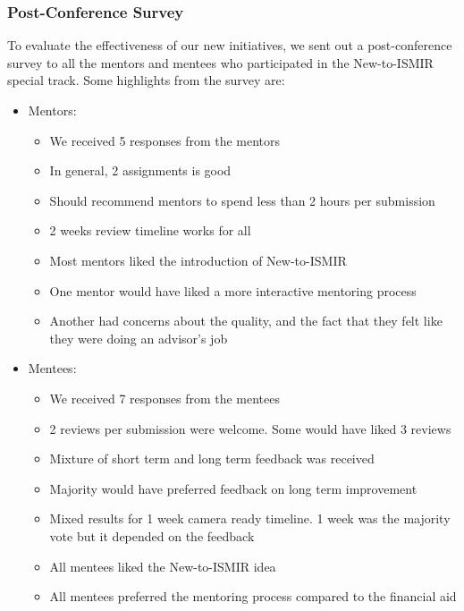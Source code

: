 \documentclass[%
10pt,								%
titlepage,						%
]
{scrartcl}
\begin{document}
        \subsubsection{Post-Conference Survey}
            To evaluate the effectiveness of our new initiatives, we sent out a post-conference survey to all the mentors and mentees who participated in the New-to-ISMIR special track. Some highlights from the survey are:
            \begin{itemize}
                \item Mentors:
                    \begin{itemize}
                        \item   We received 5 responses from the mentors
                        \item   In general, 2 assignments is good
                        \item   Should recommend mentors to spend less than 2 hours per submission
                        \item   2 weeks review timeline works for all
                        \item   Most mentors liked the introduction of New-to-ISMIR
                        \item   One mentor would have liked a more interactive mentoring process
                        \item   Another had concerns about the quality, and the fact that they felt like they were doing an advisor's job
                    \end{itemize}
                \item   Mentees:
                    \begin{itemize}
                        \item   We received 7 responses from the mentees
                        \item   2 reviews per submission were welcome. Some would have liked 3 reviews
                        \item   Mixture of short term and long term feedback was received
                        \item   Majority would have preferred feedback on long term improvement
                        \item   Mixed results for 1 week camera ready timeline. 1 week was the majority vote but it depended on the feedback
                        \item   All mentees liked the New-to-ISMIR idea
                        \item   All mentees preferred the mentoring process compared to the financial aid
                    \end{itemize}
            \end{itemize}
\end{document}
